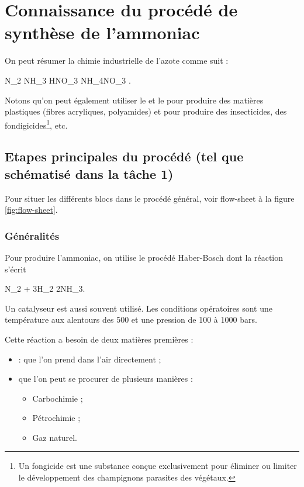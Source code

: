 \section{Connaissance du procédé de synthèse de l'ammoniac}
On peut résumer la chimie industrielle de l'azote comme suit :
\begin{chemmath}
	N_2 \rightarrow NH_3 \rightarrow HNO_3 \rightarrow NH_4NO_3
	\rightarrow {}.
\end{chemmath}
Notons qu'on peut également utiliser le  et le 
pour produire des matières plastiques (fibres acryliques, polyamides)
et pour produire des insecticides, des fondigicides\footnote{Un fongicide
est une substance conçue exclusivement pour éliminer ou limiter le
développement des champignons parasites des végétaux.}, etc.

\subsection{Etapes principales du procédé (tel que schématisé dans la tâche 1)}
Pour situer les différents blocs dans le procédé général, voir 
flow-sheet à la figure \ref{fig:flow-sheet}.
\subsubsection{Généralités}
Pour produire l'ammoniac, on utilise le procédé Haber-Bosch
dont la réaction s'écrit
\begin{chemmath}
	N_2 + 3H_2 \rightarrow 2NH_3.
\end{chemmath}
Un catalyseur est aussi souvent utilisé.
Les conditions opératoires sont une température
aux alentours des \unit{500}{\degreecelsius} et
une pression de 100 à 1000 bars.

Cette réaction a besoin de deux matières
premières :
\begin{itemize}
	\item {} : que l'on prend dans l'air
	directement ;
	\item {} que l'on peut se procurer
	de plusieurs manières :
	\begin{itemize}
		\item Carbochimie ;
		\item Pétrochimie ;
		\item Gaz naturel.
	\end{itemize}
\end{itemize}

